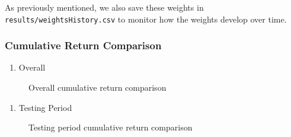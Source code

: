 \documentclass[]{article}
\providecommand{\tightlist}{%
  \setlength{\itemsep}{2pt}\setlength{\parskip}{0pt}}
\begin{document}
As previously mentioned, we also save these weights in
\texttt{results/weightsHistory.csv} to monitor how the weights develop
over time.

\hypertarget{cumulative-return-comparison}{%
\subsubsection{Cumulative Return
Comparison}\label{cumulative-return-comparison}}

\begin{enumerate}
\def\labelenumi{\arabic{enumi}.}
\tightlist
\item
  Overall
\end{enumerate}

\begin{figure}[H]
\centering
{}
\caption{Overall cumulative return comparison}
\end{figure}

\begin{enumerate}
\def\labelenumi{\arabic{enumi}.}
\setcounter{enumi}{1}
\tightlist
\item
  Testing Period
\end{enumerate}

\begin{figure}[H]
\centering
{}
\caption{Testing period cumulative return comparison}
\end{figure}
\end{document}
